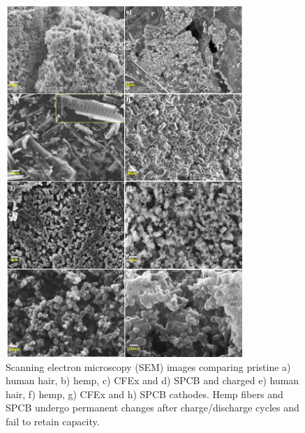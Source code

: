 \documentclass{article}
\begin{document}
\begin{figure}
  \centering
  \includegraphics[width=0.8\textwidth]{fig/SEM}
    \caption{Scanning electron microscopy (SEM) images comparing pristine a) human hair, b) hemp, c) CFEx and d) SPCB and charged e) human hair, f) hemp, g) CFEx and h) SPCB cathodes. Hemp fibers and SPCB undergo permanent changes after charge/discharge cycles and fail to retain capacity.}
  \label{fig:SEM}
\end{figure}
\end{document}
